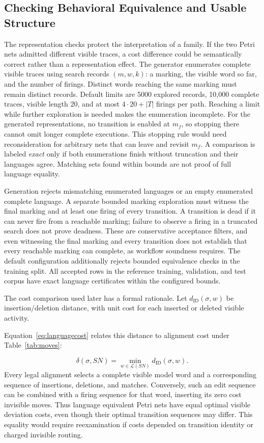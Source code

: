 \subsection{Checking Behavioral Equivalence and Usable Structure}
\label{sec:equivalence}

The representation checks protect the interpretation of a family. If the two Petri nets admitted different visible traces, a cost difference could be semantically correct rather than a representation effect. The generator enumerates complete visible traces using search records $(m,w,k)$: a marking, the visible word so far, and the number of firings. Distinct words reaching the same marking must remain distinct records. Default limits are 5000 explored records, 10,000 complete traces, visible length 20, and at most $4\cdot20+|T|$ firings per path. Reaching a limit while further exploration is needed makes the enumeration incomplete. For the generated representations, no transition is enabled at $m_f$, so stopping there cannot omit longer complete executions. This stopping rule would need reconsideration for arbitrary nets that can leave and revisit $m_f$. A comparison is labeled \emph{exact} only if both enumerations finish without truncation and their languages agree. Matching sets found within bounds are not proof of full language equality.

Generation rejects mismatching enumerated languages or an empty enumerated complete language. A separate bounded marking exploration must witness the final marking and at least one firing of every transition. A transition is dead if it can never fire from a reachable marking; failure to observe a firing in a truncated search does not prove deadness. These are conservative acceptance filters, and even witnessing the final marking and every transition does not establish that every reachable marking can complete, as workflow soundness requires. The default configuration additionally rejects bounded equivalence checks in the training split. All accepted rows in the reference training, validation, and test corpus have exact language certificates within the configured bounds.

The cost comparison used later has a formal rationale. Let $d_{\mathrm{ID}}(\sigma,w)$ be insertion/deletion distance, with unit cost for each inserted or deleted visible activity. \begin{revised}Equation~\eqref{eq:languagecost} relates this distance to alignment cost under Table~\ref{tab:moves}:\end{revised}
\begin{equation}
 \delta(\sigma,SN)=\min_{w\in\mathcal L(SN)}d_{\mathrm{ID}}(\sigma,w).
 \label{eq:languagecost}
\end{equation}
Every legal alignment selects a complete visible model word and a corresponding sequence of insertions, deletions, and matches. Conversely, such an edit sequence can be combined with a firing sequence for that word, inserting its zero cost invisible moves. Thus language equivalent Petri nets have equal optimal visible deviation costs, even though their optimal transition sequences may differ. This equality would require reexamination if costs depended on transition identity or charged invisible routing.

